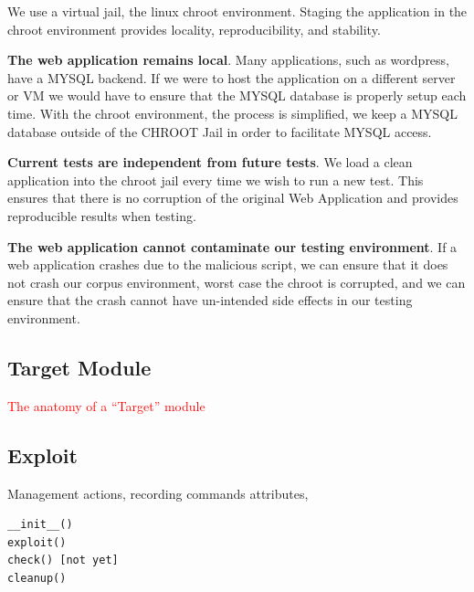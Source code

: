 \documentclass[letterpaper,twocolumn,10pt]{article}
\begin{document}
We use a virtual jail, the linux chroot environment.  Staging the application in the chroot environment provides locality, reproducibility, and stability.  

{\bf The web application remains local}.  Many applications, such as wordpress, have a MYSQL backend.  If we were to host the application on a different server or VM we would have to ensure that the MYSQL database is properly setup each time.  With the chroot environment, the process is simplified, we keep a MYSQL database outside of the CHROOT Jail in order to facilitate MYSQL access.  

{\bf Current tests are independent from future tests}.  We load a clean application into the chroot jail every time we wish to run a new test.  This ensures that there is no corruption of the original Web Application and provides reproducible results when testing.

{\bf The web application cannot contaminate our testing environment}.  If a web application crashes due to the malicious script, we can ensure that it does not crash our corpus environment, worst case the chroot is corrupted, and we can ensure that the crash cannot have un-intended side effects in our testing environment.  


\subsection{Target Module}
\textcolor{red}{The anatomy of a ``Target'' module}
\subsection{Exploit}

Management actions, recording commands
attributes,
\begin{verbatim} 
__init__()
exploit()
check() [not yet]
cleanup()
\end{verbatim}
\end{document}
